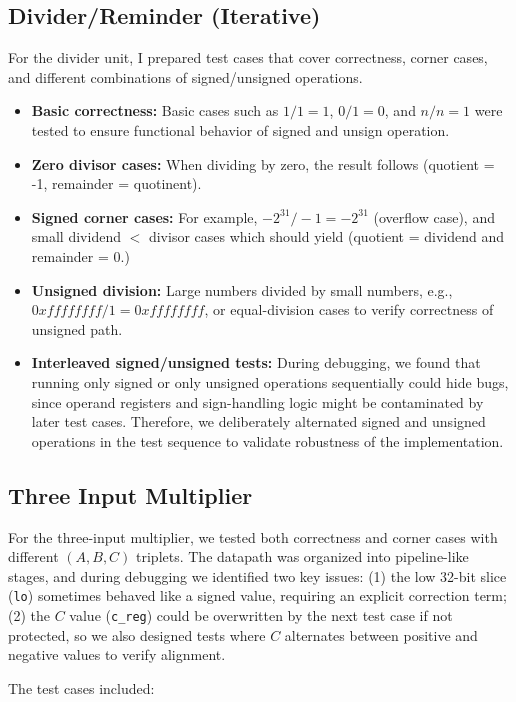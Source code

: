 \documentclass[11pt,a4paper]{article}
\begin{document}
\subsection{Divider/Reminder (Iterative)}

For the divider unit, I prepared test cases that cover correctness, corner cases, and different combinations of signed/unsigned operations.  

\begin{itemize}
  \item \textbf{Basic correctness:} Basic cases such as $1/1=1$, $0/1=0$, and $n/n=1$ were tested to ensure functional behavior of signed and unsign operation.
  \item \textbf{Zero divisor cases:} When dividing by zero, the result follows (quotient = -1, remainder = quotinent).  
  \item \textbf{Signed corner cases:} For example, $-2^{31} / -1 = -2^{31}$ (overflow case), and small dividend $< $ divisor cases which should yield (quotient = dividend and remainder = 0.)
  \item \textbf{Unsigned division:} Large numbers divided by small numbers, e.g., $0xffffffff / 1 = 0xffffffff$, or equal-division cases to verify correctness of unsigned path.
  \item \textbf{Interleaved signed/unsigned tests:} During debugging, we found that running only signed or only unsigned operations sequentially could hide bugs, since operand registers and sign-handling logic might be contaminated by later test cases. Therefore, we deliberately alternated signed and unsigned operations in the test sequence to validate robustness of the implementation.
\end{itemize}
\subsection{Three Input Multiplier}
For the three-input multiplier, we tested both correctness and corner cases with different $(A,B,C)$ triplets.  
The datapath was organized into pipeline-like stages, and during debugging we identified two key issues:  
(1) the low 32-bit slice (\texttt{lo}) sometimes behaved like a signed value, requiring an explicit correction term;  
(2) the $C$ value (\texttt{c\_reg}) could be overwritten by the next test case if not protected, so we also designed tests where $C$ alternates between positive and negative values to verify alignment.

The test cases included:
\end{document}
